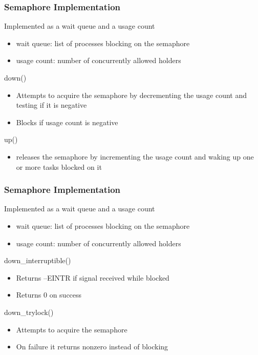 \begin{frame}[fragile]
    \frametitle{Semaphore Implementation}
    \Large
    Implemented as a wait queue and a usage count
    
    \large
    \begin{itemize}
        \item wait queue: list of processes blocking on the semaphore
        
        \item usage count: number of concurrently allowed holders
        
    \end{itemize}  

    down()
    \begin{itemize}
        \item  Attempts to acquire the semaphore by decrementing the
        usage count and testing if it is negative
        \item Blocks if usage count is negative
   \end{itemize}  

    up()
\begin{itemize}
    \item  releases the semaphore by incrementing the usage count
    and waking up one or more tasks blocked on it
    
\end{itemize}  




\end{frame}


\begin{frame}[fragile]
    \frametitle{Semaphore Implementation}
    \Large
    Implemented as a wait queue and a usage count
    
    \large
    \begin{itemize}
        \item wait queue: list of processes blocking on the semaphore
        
        \item usage count: number of concurrently allowed holders
        
    \end{itemize}  
    
    down\_interruptible()
    
    \begin{itemize}
        \item  Returns –EINTR if signal received while blocked
        \item Returns 0 on success        
    \end{itemize}  
    
    down\_trylock()
    \begin{itemize}
        \item  Attempts to acquire the semaphore
        \item  On failure it returns nonzero instead of blocking
    \end{itemize}  
    
\end{frame}



